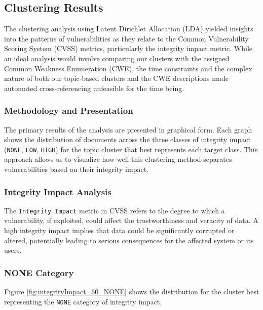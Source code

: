 \documentclass[12pt]{article}
\begin{document}
\subsection{Clustering Results}

The clustering analysis using Latent Dirichlet Allocation (LDA) yielded insights into the patterns
of vulnerabilities as they relate to the Common Vulnerability Scoring System (CVSS) metrics,
particularly the integrity impact metric. While an ideal analysis would involve comparing our
clusters with the assigned Common Weakness Enumeration (CWE), the time constraints and the complex
nature of both our topic-based clusters and the CWE descriptions made automated cross-referencing
unfeasible for the time being.

\subsubsection*{Methodology and Presentation}

The primary results of the analysis are presented in graphical form. Each graph shows the
distribution of documents across the three classes of integrity impact (\texttt{NONE}, \texttt{LOW},
\texttt{HIGH}) for the topic cluster that best represents each target class. This approach allows us
to visualize how well this clustering method separates vulnerabilities based on their integrity impact.

\subsubsection{Integrity Impact Analysis}

The \texttt{Integrity Impact} metric in CVSS refers to the degree to which a vulnerability, if exploited,
could affect the trustworthiness and veracity of data. A high integrity impact implies that data
could be significantly corrupted or altered, potentially leading to serious consequences for the
affected system or its users.

\subsubsection*{NONE Category}

Figure \ref{fig:integrityImpact_60_NONE} shows the distribution for the cluster best representing
the \texttt{NONE} category of integrity impact.
\end{document}
